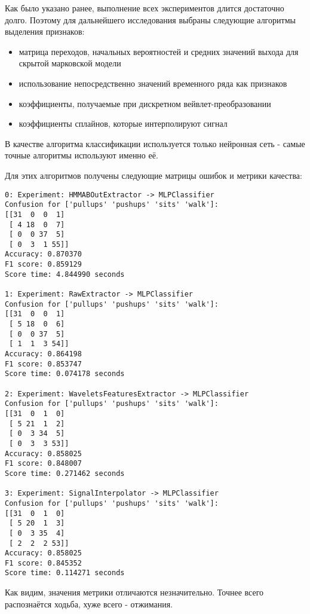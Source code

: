 
Как было указано ранее, выполнение всех экспериментов длится достаточно долго. Поэтому для дальнейшего исследования выбраны следующие алгоритмы выделения признаков:

\begin{itemize}
\item матрица переходов, начальных вероятностей и средних значений выхода для скрытой марковской модели
\item использование непосредственно значений временного ряда как признаков
\item коэффициенты, получаемые при дискретном вейвлет-преобразовании
\item коэффициенты сплайнов, которые интерполируют сигнал
\end{itemize}

В качестве алгоритма классификации используется только нейронная сеть - самые точные алгоритмы используют именно её.

Для этих алгоритмов получены следующие матрицы ошибок и метрики качества:

\begin{verbatim}
0: Experiment: HMMABOutExtractor -> MLPClassifier
Confusion for ['pullups' 'pushups' 'sits' 'walk']:
[[31  0  0  1]
 [ 4 18  0  7]
 [ 0  0 37  5]
 [ 0  3  1 55]]
Accuracy: 0.870370
F1 score: 0.859129
Score time: 4.844990 seconds

1: Experiment: RawExtractor -> MLPClassifier
Confusion for ['pullups' 'pushups' 'sits' 'walk']:
[[31  0  0  1]
 [ 5 18  0  6]
 [ 0  0 37  5]
 [ 1  1  3 54]]
Accuracy: 0.864198
F1 score: 0.853747
Score time: 0.074178 seconds

2: Experiment: WaveletsFeaturesExtractor -> MLPClassifier
Confusion for ['pullups' 'pushups' 'sits' 'walk']:
[[31  0  1  0]
 [ 5 21  1  2]
 [ 0  3 34  5]
 [ 0  3  3 53]]
Accuracy: 0.858025
F1 score: 0.848007
Score time: 0.271462 seconds

3: Experiment: SignalInterpolator -> MLPClassifier
Confusion for ['pullups' 'pushups' 'sits' 'walk']:
[[31  0  1  0]
 [ 5 20  1  3]
 [ 0  3 35  4]
 [ 2  2  2 53]]
Accuracy: 0.858025
F1 score: 0.845352
Score time: 0.114271 seconds
\end{verbatim}

Как видим, значения метрики отличаются незначительно. Точнее всего распознаётся ходьба, хуже всего - отжимания. 


